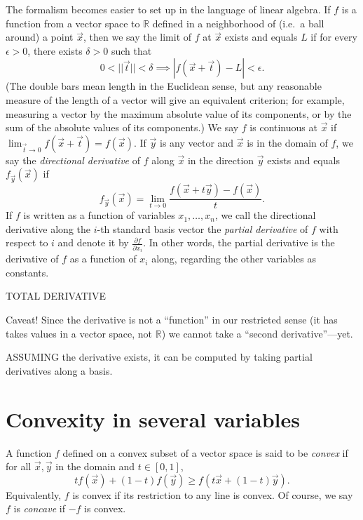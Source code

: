 \documentclass[12pt]{report}
\def\RR{\mathbb{R}}
\def\vt{\vec{t}}
\def\vx{\vec{x}}
\def\vy{\vec{y}}
\numberwithin{exc}{section}
\begin{document}
The formalism becomes easier to set up in the language of linear 
algebra. If $f$ is a function from a vector space to $\RR$ defined in 
a neighborhood of (i.e.\ a ball around) a point $\vx$, then we say the 
limit of $f$ at $\vx$ exists and equals $L$ if for every $\epsilon > 
0$, there exists $\delta > 0$ such that
\[
0 < ||\vt|| < \delta \implies |f(\vx + \vt) - L| < \epsilon.
\]
(The double bars mean length in the Euclidean sense, but any 
reasonable measure of the length of a vector will give an equivalent 
criterion; for example, measuring a vector by the maximum absolute 
value of its components, or by the sum of the absolute values of its 
components.) We say $f$ is continuous at $\vx$ if $\lim_{\vt \to 0} 
f(\vx + \vt) = f(\vx)$. If $\vy$ is any vector and $\vx$ is in the 
domain of $f$, we say the \emph{directional derivative} of $f$ along 
$\vx$ in the direction $\vy$ exists and equals $f_{\vy}(\vx)$ if
\[
f_{\vy}(\vx) = \lim_{t \to 0} \frac{f(\vx + t\vy) - f(\vx)}{t}.
\]
If $f$ is written as a function of variables $x_1, \dots, x_n$, we 
call the directional derivative along the $i$-th standard basis vector 
the \emph{partial derivative} of $f$ with respect to $i$ and denote it 
by $\frac{\partial f}{\partial x_i}$. In other words, the partial 
derivative is the derivative of $f$ as a function of $x_i$ along, 
regarding the other variables as constants.


TOTAL DERIVATIVE

Caveat! Since the derivative is not a ``function'' in our restricted 
sense (it has takes values in a vector space, not $\RR$) we cannot take a 
``second derivative''---yet.

ASSUMING the derivative exists, it can be computed by taking partial 
derivatives along a basis.

\section{Convexity in several variables}
A function $f$ defined on a convex subset of a
vector space is said to be \emph{convex} if for all $\vx, \vy$ in the 
domain and $t \in [0,1]$,
\[
tf(\vx) + (1-t)f(\vy) \geq f(t\vx + (1-t)\vy).
\]
Equivalently, $f$ is convex if its restriction to any line is convex. 
Of course, we say $f$ is \emph{concave} if $-f$ is convex.
\end{document}
